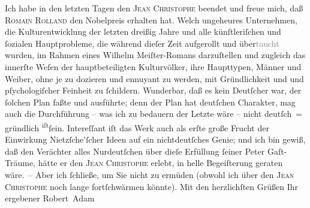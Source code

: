 \begin{ledgroupsized}[t]{13cm}
           \pstart
           Ich habe in den letzten Tagen den \textsc{Jean Christophe} beendet und freue mich, daß \textsc{Romain Rolland} den Nobelpreis erhalten hat. Welch ungeheures
               Unternehmen, die Kulturentwicklung der letzten dreißig Jahre und alle künſtleriſchen
               und ſozialen Hauptprobleme, die während dieſer Zeit aufgerollt und
                  über\textcolor{gray}{taucht} wurden, im Rahmen eines Wilhelm Meiſter-Romans darzuſtellen und zugleich das innerſte Weſen der
               hauptbeteiligten Kulturvölker, ihre Haupttypen, Männer und Weiber, ohne je zu
               dozieren und ennuyant zu werden, mit Gründlichkeit und und pſychologiſcher Feinheit
                   zu ſchildern. Wunderbar, daß es kein Deutſcher
               war, der ſolchen Plan faßte und ausführte; denn der Plan hat deutſchen Charakter, mag
               auch die Durchführung – was ich zu bedauern {\pb}der
               Letzte wäre – nicht deutſch = gründlich \substVorne{}\textsuperscript{iſt}\substDazwischen{}ſein\substHinten{}. Intereſſant iſt das Werk auch als erſte große Frucht der Einwirkung Nietzſche’ſcher Ideen auf ein nichtdeutſches
               Genie; und ich bin gewiß, daß den Verächter alles Nurdeutſchen über dieſe Erfüllung
               ſeiner Peter Gaſt-Träume, hätte er den \textsc{Jean Christophe} erlebt, in helle Begeiſterung geraten wäre. –\pend
           \pstart
           Aber ich ſchließe, um Sie nicht zu ermüden (obwohl ich über den \textsc{Jean Christophe} noch lange fortſchwärmen könnte).\pend
           \pstart
           Mit den herzlichſten Grüßen Ihr ergebener\pend
           \pstart \spacefill\mbox{Robert Adam}\pend{}
         
         \endnumbering{}\end{ledgroupsized}  \newcommand{\dateiname}{L02246}\newcommand{\titel}{Robert Adam an Arthur Schnitzler, 20. 11. 1916}\newcommand{\editorInnen}{Martin Anton Müller und Gerd-Hermann Susen}
      